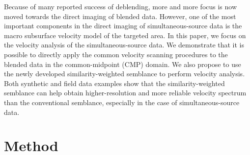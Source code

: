 Because of many reported success of deblending, more and more focus is now moved towards the direct imaging of blended data.  However, one of the most important components in the direct imaging of simultaneous-source data is the macro subsurface velocity model of the targeted area. In this paper, we focus on the velocity analysis  of the simultaneous-source data. We demonstrate that it is possible to directly apply the common velocity scanning procedures to the blended data in the common-midpoint (CMP) domain. We also propose to use the newly developed similarity-weighted semblance \cite[]{yangkang2015vel,shuwei2015vel} to perform  velocity analysis. Both synthetic and field data examples show that the similarity-weighted semblance can help obtain higher-resolution and more reliable velocity spectrum than the conventional semblance, especially in the case of simultaneous-source data. 

\section{Method}
